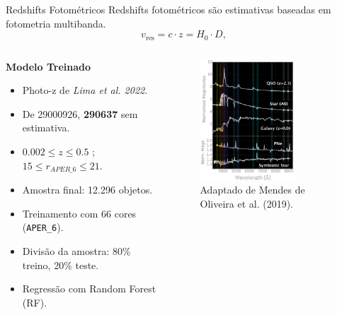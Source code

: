 \begin{frame}[c]{Redshifts Fotométricos}
    Redshifts fotométricos são estimativas baseadas em fotometria multibanda. 
    \begin{equation}
        v_\text{res} = c \cdot z = H_0 \cdot D,
    \end{equation}

    \begin{columns}
        \begin{column}{0.46\linewidth}
            \centering
            \scriptsize
            \textbf{Modelo Treinado}
            \begin{itemize}
                \item Photo-z de \textit{Lima et al. 2022}. 
                \item De 29000926, \textbf{290637} sem estimativa.
                \item $0.002 \leq z \leq 0.5$ ; $15 \leq r_{APER\_6} \leq 21$.
                \item Amostra final: 12.296 objetos.
                \item Treinamento com 66 cores (\texttt{APER\_6}).
                \item Divisão da amostra: 80\% treino, 20\% teste.
                \item Regressão com Random Forest (RF).
            \end{itemize}
        \end{column}
        \begin{column}{0.46\linewidth}
            \begin{figure}
                \centering
                \includegraphics[height=4.5cm]{script/images/splus_spectra_sed.png}
                \caption{Adaptado de Mendes de Oliveira et al. (2019).}
            \end{figure}
        \end{column}
    \end{columns}
\end{frame}

